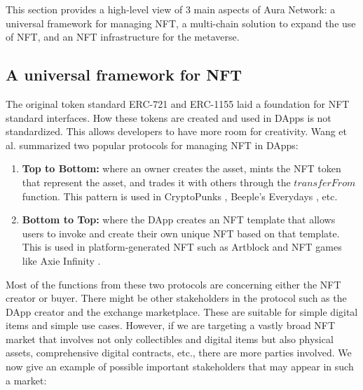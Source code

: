 \documentclass[12pt]{article}
\begin{document}
This section provides a high-level view of 3 main aspects of Aura Network: a universal framework for managing NFT, a multi-chain solution to expand the use of NFT, and an NFT infrastructure for the metaverse.

\subsection{A universal framework for NFT}
The original token standard ERC-721 and ERC-1155 laid a foundation for NFT standard interfaces. How these tokens are created and used in DApps is not standardized. This allows developers to have more room for creativity. Wang et al. \cite{wang2021non} summarized two popular protocols for managing NFT in DApps:
\begin{enumerate}
\item \textbf{Top to Bottom:} where an owner creates the asset, mints the NFT token that represent the asset, and trades it with others through the $transferFrom$ function. This pattern is used in CryptoPunks \cite{cryptopunks}, Beeple's Everydays \cite{beeple}, etc.
\item \textbf{Bottom to Top:} where the DApp creates an NFT template that allows users to invoke and create their own unique NFT based on that template. This is used in platform-generated NFT such as Artblock \cite{artblock} and NFT games like Axie Infinity \cite{axie}.
\end{enumerate}

Most of the functions from these two protocols are concerning either the NFT creator or buyer. There might be other stakeholders in the protocol such as the DApp creator and the exchange marketplace. These are suitable for simple digital items and simple use cases. However, if we are targeting a vastly broad NFT market that involves not only collectibles and digital items but also physical assets, comprehensive digital contracts, etc., there are more parties involved. We now give an example of possible important stakeholders that may appear in such a market:
\end{document}
